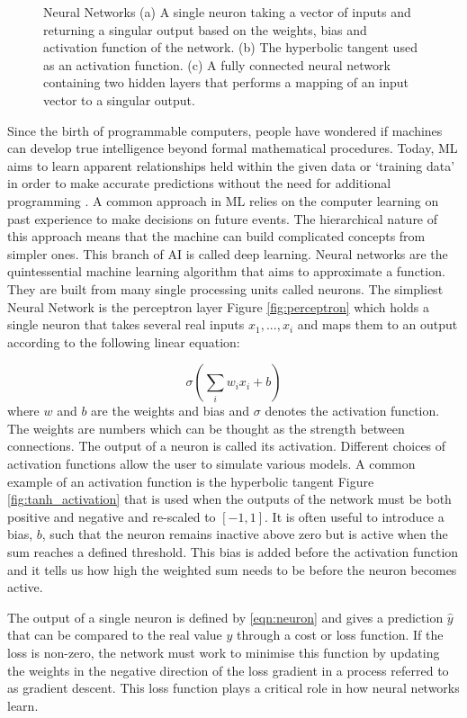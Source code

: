 \documentclass[12pt]{iopart}
\begin{document}
\begin{figure}
\begin{minipage}[b]{0.7\linewidth}
    \end{minipage}
    \caption{Neural Networks (a) A single neuron taking a vector of inputs and returning a singular output based on the weights, bias and activation function of the network. (b) The hyperbolic tangent used as an activation function. (c) A fully connected neural network containing two hidden layers that performs a mapping of an input vector to a singular output.}
\end{figure}

Since the birth of programmable computers, people have wondered if machines can develop true intelligence beyond formal mathematical procedures. Today, ML aims to learn apparent relationships held within the given data or `training data' in order to make accurate predictions without the need for additional programming . A common approach in ML relies on the computer learning on past experience to make decisions on future events. The hierarchical nature of this approach means that the machine can build complicated concepts from simpler ones. This branch of AI is called deep learning.
Neural networks are the quintessential machine learning algorithm that aims to approximate a function. They are built from many single processing units called neurons. The simpliest Neural Network is the perceptron layer Figure \ref{fig:perceptron} which holds a single neuron that takes several real inputs $x_{1}, ... , x_{i}$ and maps them to an output according to the following linear equation: 

\begin{equation}
\sigma(\sum_i w_i x_i + b)
\label{eqn:neuron}
\end{equation}
where $w$ and $b$ are the weights and bias and $\sigma$ denotes the activation function. The weights are numbers which can be thought as the strength between connections. The output of a neuron is called its activation. Different choices of activation functions allow the user to simulate various models. A common example of an activation function is the hyperbolic tangent Figure \ref{fig:tanh_activation} that is used when the outputs of the network must be both positive and negative and re-scaled to $[-1,1]$. It is often useful to introduce a bias, $b$, such that the neuron remains inactive above zero but is active when the sum reaches a defined threshold. This bias is added before the activation function and it tells us how high the weighted sum needs to be before the neuron becomes active.

The output of a single neuron is defined by \ref{eqn:neuron} and gives a prediction $\hat{y}$ that can be compared to the real value $y$ through a cost or loss function. If the loss is non-zero, the network must work to minimise this function by updating the weights in the negative direction of the loss gradient in a process referred to as gradient descent. This loss function plays a critical role in how neural networks learn.
\end{document}
